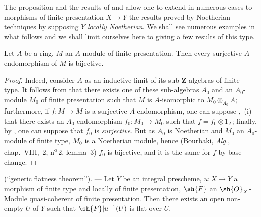 \begin{env}[8.9.2]
\label{IV.8.9.2}
The proposition  and the results of  and  allow one to extend in numerous cases to morphisms of finite presentation $X\to Y$ the results proved by Noetherian techniques by supposing $Y$ \emph{locally Noetherian}.
We shall see numerous examples in what follows and we shall limit ourselves here to giving a few results of this type.
\end{env}

\begin{proposition}[8.9.3]
\label{IV.8.9.3}
Let $A$ be a ring, $M$ an $A$-module of finite presentation.
Then every surjective $A$-endomorphism of $M$ is bijective.
\end{proposition}

\begin{proof}
Indeed, consider $A$ as an inductive limit of its sub-$\mathbf{Z}$-algebras of finite type.
It follows from  that there exists one of these sub-algebras $A_0$ and an $A_0$-module $M_0$ of finite presentation such that $M$ is $A$-isomorphic to $M_0\otimes_{A_0}A$; furthermore, if $f:M\to M$ is a surjective $A$-endomorphism, one can suppose ,~(i) that there exists an $A_0$-endomorphism $f_0:M_0\to M_0$ such that $f=f_0\otimes 1_A$; finally, by , one can suppose that $f_0$ is \emph{surjective}.
But as $A_0$ is Noetherian and $M_0$ an $A_0$-module of finite type, $M_0$ is a Noetherian module, hence (Bourbaki, \emph{Alg.}, chap.~VIII, \textsection\,2, n\textsuperscript{o}\,2, lemma~3) $f_0$ is bijective, and it is the same for $f$ by base change.
\end{proof}

\begin{proposition}[8.9.4]
\label{IV.8.9.4}
(``generic flatness theorem''). --- Let $Y$ be an integral prescheme, $u:X\to Y$ a morphism of finite type and locally of finite presentation, $\sh{F}$ an $\sh{O}_X$-Module quasi-coherent of finite presentation.
Then there exists an open non-empty $U$ of $Y$ such that $\sh{F}|u^{-1}(U)$ is flat over $U$.
\end{proposition}

